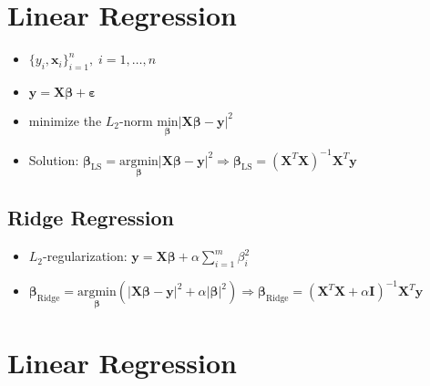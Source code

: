 \documentclass[11pt]{article}
\begin{document}
\newpage
\hypertarget{linear-regression}{%
\section*{Linear Regression}\label{linear-regression}}

\begin{itemize}
    \item $\{y_i, \boldsymbol{x}_i\}_{i=1}^n,\; i=1,\dots,n$
    \item $\boldsymbol{y} = \boldsymbol{X}\boldsymbol{\beta} + \boldsymbol{\varepsilon}$
    \item minimize the \(L_2\)-norm $\underset{\boldsymbol{\beta}}{\text{min}}{\big|}\boldsymbol{X}\boldsymbol{\beta} - \boldsymbol{y}{\big|}^2$
    \item Solution: $\boldsymbol{\beta}_{\text{LS}} = \underset{\boldsymbol{\beta}}{\text{arg}\text{min}}{\big|}\boldsymbol{X}\boldsymbol{\beta} - \boldsymbol{y}{\big|}^2 \Rightarrow \boldsymbol{\beta}_{\text{LS}} = \left(\boldsymbol{X}^T\boldsymbol{X}\right)^{-1}\boldsymbol{X}^T\boldsymbol{y}$
\end{itemize}

\hypertarget{ridge-regression}{%
\subsection*{Ridge Regression}\label{ridge-regression}}

\begin{itemize}
    \item $L_2$-regularization: $\boldsymbol{y} = \boldsymbol{X}\boldsymbol{\beta} + \alpha\sum\limits_{i=1}^m\beta^2_i$
    \item $\boldsymbol{\beta}_{\text{Ridge}} = \underset{\boldsymbol{\beta}}{\text{arg}\text{min}}\left({\big|}\boldsymbol{X}\boldsymbol{\beta} - \boldsymbol{y}{\big|}^2 + \alpha{\big|}\boldsymbol{\beta}{\big|}^2\right) \Rightarrow \boldsymbol{\beta}_{\text{Ridge}} = \left(\boldsymbol{X}^T\boldsymbol{X} + \alpha \boldsymbol{I}\right)^{-1}\boldsymbol{X}^T\boldsymbol{y}$
\end{itemize}

\newpage
\hypertarget{linear-regression}{%
\section*{Linear Regression}\label{linear-regression}}
\end{document}
